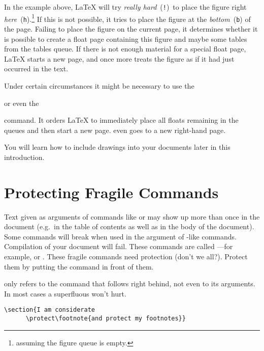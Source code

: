 \noindent In the example above, 
\LaTeX{} will try \emph{really hard}~(\texttt{!})\ to place the figure
right \emph{here}~(\texttt{h}).\footnote{assuming the figure queue is
  empty.} If this is not possible, it tries to place the figure at the
\emph{bottom}~(\texttt{b}) of the page.  Failing to place the figure
on the current page, it determines whether it is possible to create a float
page containing this figure and maybe some tables from the tables
queue. If there is not enough material for a special float page,
\LaTeX{} starts a new page, and once more treats the figure as if it
had just occurred in the text.

Under certain circumstances it might be necessary to use the 

\begin{lscommand}
 or even the  
\end{lscommand}

\noindent command. It orders \LaTeX{} to immediately place all 
floats remaining in the queues and then start a new
page.  even goes to a new right-hand page.

You will learn how to include \PSi{}
drawings into your \LaTeXe{} documents later in this introduction.

\section{Protecting Fragile Commands}

Text given as arguments of commands like  or  may
show up more than once in the document (e.g.\ in the table of contents as
well as in the body of the document). Some commands will break when used in
the argument of -like commands. Compilation of your document
will fail. These commands are called ---for example,
 or . These fragile commands need protection (don't
we all?). Protect them by putting the  command in front
of them.

 only refers to the command that follows right behind, not even
to its arguments. In most cases a superfluous  won't hurt.

\begin{code}
\verb|\section{I am considerate|\\
\verb|      \protect\footnote{and protect my footnotes}}|
\end{code}

